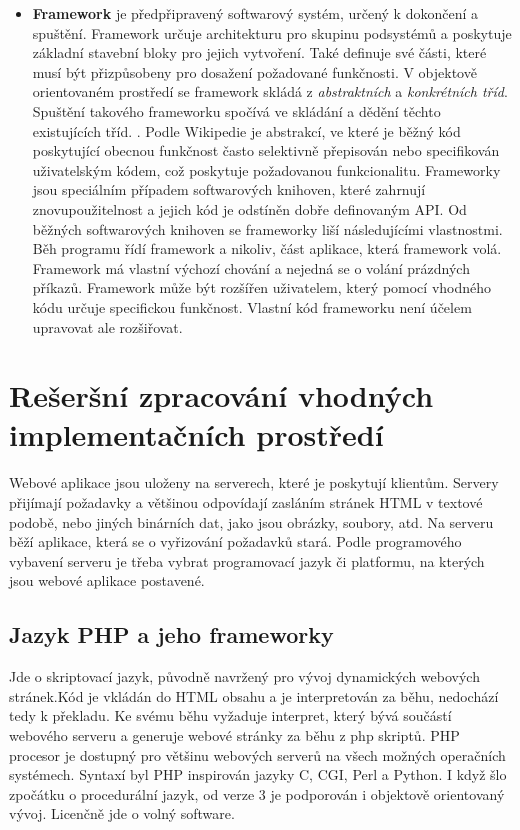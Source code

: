 \documentclass[11pt,twoside,a4paper]{book}
\begin{document}
\begin{itemize}
\item \textbf{Framework} je předpřipravený softwarový systém, určený k dokončení a spuštění. Framework určuje architekturu pro skupinu podsystémů a poskytuje základní stavební bloky pro jejich vytvoření. Také definuje své části, které musí být přizpůsobeny pro dosažení požadované funkčnosti. V objektově orientovaném prostředí se framework skládá z \textit{abstraktních} a \textit{konkrétních tříd}. Spuštění takového frameworku spočívá ve skládání a dědění těchto existujících tříd. \cite{POSA}. Podle Wikipedie je abstrakcí, ve které je běžný kód poskytující obecnou funkčnost často selektivně přepisován nebo specifikován uživatelským kódem, což poskytuje požadovanou funkcionalitu. Frameworky jsou speciálním případem softwarových knihoven, které zahrnují znovupoužitelnost a jejich kód je odstíněn dobře definovaným API. Od běžných softwarových knihoven se frameworky liší následujícími vlastnostmi. Běh programu řídí framework a nikoliv, část aplikace, která framework volá. Framework má vlastní výchozí chování a nejedná se o volání prázdných příkazů. Framework může být rozšířen uživatelem, který pomocí vhodného kódu určuje specifickou funkčnost. Vlastní kód frameworku není účelem upravovat ale rozšiřovat. \cite{wiki:software-framework} 
\end{itemize}

\section{Rešeršní zpracování vhodných implementačních prostředí}

Webové aplikace jsou uloženy na serverech, které je poskytují klientům. Servery přijímají požadavky a většinou odpovídají zasláním stránek HTML v textové podobě, nebo jiných binárních dat, jako jsou obrázky, soubory, atd. Na serveru běží aplikace, která se o vyřizování požadavků stará. Podle programového vybavení serveru je třeba vybrat programovací jazyk či platformu, na kterých jsou webové aplikace postavené.

\subsection{Jazyk PHP a jeho frameworky}
Jde o skriptovací jazyk, původně navržený pro vývoj dynamických webových stránek.Kód je vkládán do HTML obsahu a je interpretován za běhu, nedochází tedy k překladu.
 Ke svému běhu vyžaduje interpret, který bývá součástí webového serveru a generuje webové stránky za běhu z php skriptů. PHP procesor je dostupný pro většinu webových serverů na všech možných operačních systémech. Syntaxí byl PHP inspirován jazyky C, CGI, Perl a Python. I když šlo zpočátku o procedurální jazyk, od verze 3  je podporován i objektově orientovaný vývoj. Licenčně jde o volný software.\cite{phpmanual}
 
\end{document}
